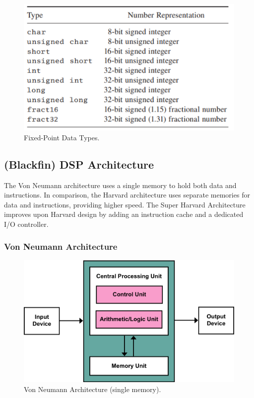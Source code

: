 \begin{figure} [H]
	\centering
	\includegraphics[width=0.85\linewidth]{graphics/3.png}
	\caption{Fixed-Point Data Types.}
	\label{fig:3}
\end{figure}

\subsection{(Blackfin) DSP Architecture}
The Von Neumann architecture uses a single memory to hold both data and instructions. In comparison, the Harvard architecture uses separate memories 
for data and instructions, providing higher speed. The Super Harvard Architecture improves upon Harvard design by adding an instruction cache and a dedicated I/O controller. 

\subsubsection{Von Neumann Architecture}
\begin{figure} [H]
	\centering
	\includegraphics[width=0.85\linewidth]{graphics/4.png}
	\caption{Von Neumann Architecture (single memory).}
	\label{fig:4}
\end{figure}

